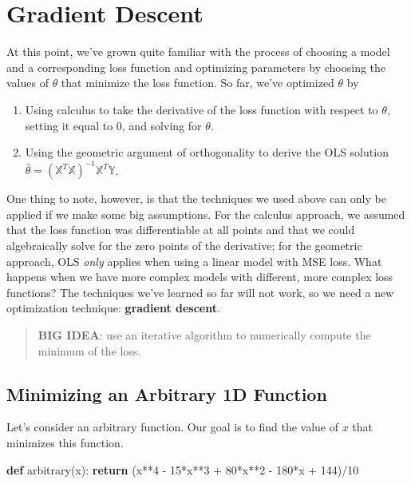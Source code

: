 \documentclass[
  letterpaper,
  DIV=11,
  numbers=noendperiod]{scrreprt}
\newenvironment{Shaded}{\begin{snugshade}}{\end{snugshade}}
\newcommand{\ControlFlowTok}[1]{\textcolor[rgb]{0.00,0.23,0.31}{\textbf{#1}}}
\newcommand{\DecValTok}[1]{\textcolor[rgb]{0.68,0.00,0.00}{#1}}
\newcommand{\KeywordTok}[1]{\textcolor[rgb]{0.00,0.23,0.31}{\textbf{#1}}}
\newcommand{\NormalTok}[1]{\textcolor[rgb]{0.00,0.23,0.31}{#1}}
\newcommand{\OperatorTok}[1]{\textcolor[rgb]{0.37,0.37,0.37}{#1}}
\providecommand{\tightlist}{%
  \setlength{\itemsep}{0pt}\setlength{\parskip}{0pt}}\usepackage{longtable,booktabs,array}
\begin{document}
\section{Gradient Descent}\label{gradient-descent}

At this point, we've grown quite familiar with the process of choosing a
model and a corresponding loss function and optimizing parameters by
choosing the values of \(\theta\) that minimize the loss function. So
far, we've optimized \(\theta\) by

\begin{enumerate}
\def\labelenumi{\arabic{enumi}.}
\tightlist
\item
  Using calculus to take the derivative of the loss function with
  respect to \(\theta\), setting it equal to 0, and solving for
  \(\theta\).
\item
  Using the geometric argument of orthogonality to derive the OLS
  solution
  \(\hat{\theta} = (\mathbb{X}^T \mathbb{X})^{-1}\mathbb{X}^T \mathbb{Y}\).
\end{enumerate}

One thing to note, however, is that the techniques we used above can
only be applied if we make some big assumptions. For the calculus
approach, we assumed that the loss function was differentiable at all
points and that we could algebraically solve for the zero points of the
derivative; for the geometric approach, OLS \emph{only} applies when
using a linear model with MSE loss. What happens when we have more
complex models with different, more complex loss functions? The
techniques we've learned so far will not work, so we need a new
optimization technique: \textbf{gradient descent}.

\begin{quote}
\textbf{BIG IDEA}: use an iterative algorithm to numerically compute the
minimum of the loss.
\end{quote}

\subsection{Minimizing an Arbitrary 1D
Function}\label{minimizing-an-arbitrary-1d-function}

Let's consider an arbitrary function. Our goal is to find the value of
\(x\) that minimizes this function.

\begin{Shaded}
\begin{Highlighting}[]
\KeywordTok{def}\NormalTok{ arbitrary(x):}
    \ControlFlowTok{return}\NormalTok{ (x}\OperatorTok{**}\DecValTok{4} \OperatorTok{{-}} \DecValTok{15}\OperatorTok{*}\NormalTok{x}\OperatorTok{**}\DecValTok{3} \OperatorTok{+} \DecValTok{80}\OperatorTok{*}\NormalTok{x}\OperatorTok{**}\DecValTok{2} \OperatorTok{{-}} \DecValTok{180}\OperatorTok{*}\NormalTok{x }\OperatorTok{+} \DecValTok{144}\NormalTok{)}\OperatorTok{/}\DecValTok{10}
\end{Highlighting}
\end{Shaded}
\end{document}
